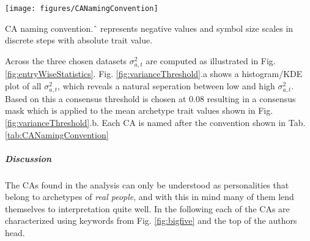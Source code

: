 \begin{table}[h!]
	\centering
	\texttt{[image: figures/CANamingConvention]}
	\caption{\label{tab:CANamingConvention} CA naming convention. \^\, represents negative values and symbol size scales in discrete steps with absolute trait value.}
\end{table}


Across the three chosen datasets $\sigma_{a,t}^2$ are computed as illustrated in Fig. \ref{fig:entryWiseStatistics}. Fig. \ref{fig:varianceThreshold}.a shows a histogram/KDE plot of all $\sigma_{a,t}^2$, which reveals a natural seperation between low and high $\sigma_{a,t}^2$. Based on this a consensus threshold is chosen at 0.08 resulting in a consensus mask which is applied to the mean archetype trait values shown in Fig. \ref{fig:varianceThreshold}.b. Each CA is named after the convention shown in Tab. \ref{tab:CANamingConvention}

\subparagraph*{Discussion} The CAs found in the analysis can only be understood as personalities that belong to archetypes of \textit{real people}, and with this in mind many of them lend themselves to interpretation quite well. In the following each of the CAs are characterized using keywords from Fig. \ref{fig:bigfive} and the top of the authors head.

